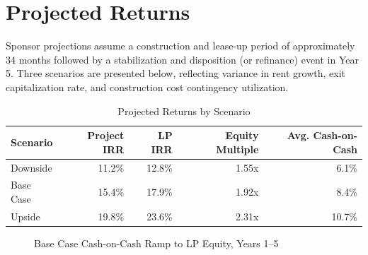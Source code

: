 \section{Projected Returns}
Sponsor projections assume a construction and lease-up period of approximately 34 months
followed by a stabilization and disposition (or refinance) event in Year 5. Three scenarios are
presented below, reflecting variance in rent growth, exit capitalization rate, and construction
cost contingency utilization.

\begin{table}[H]
\centering
\caption{Projected Returns by Scenario}
\label{tab:returns}
\vspace{4pt}
\begin{tabularx}{\linewidth}{X r r r r}
\toprule
\rowcolor{jvnavy}
\textbf{\color{white}Scenario} & \textbf{\color{white}Project IRR} & \textbf{\color{white}LP IRR} & \textbf{\color{white}Equity Multiple} & \textbf{\color{white}Avg. Cash-on-Cash} \\
\midrule
Downside & 11.2\% & 12.8\% & 1.55x & 6.1\% \\
\rowcolor{jvcream}
Base Case & 15.4\% & 17.9\% & 1.92x & 8.4\% \\
Upside & 19.8\% & 23.6\% & 2.31x & 10.7\% \\
\bottomrule
\end{tabularx}
\end{table}

\begin{figure}[H]
\centering
{}
\caption{Base Case Cash-on-Cash Ramp to LP Equity, Years 1--5}
\label{fig:cashoncash}
\end{figure}

